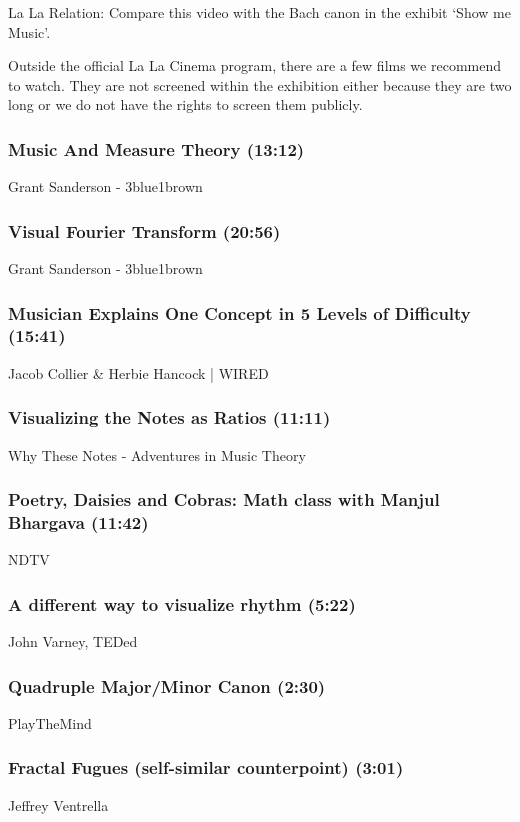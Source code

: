La La Relation: Compare this video with the Bach canon in the exhibit `Show me Music'.


Outside the official La La Cinema program, there are a few films we recommend to watch. They are not screened within the exhibition either because they are two long or we do not have the rights to screen them publicly.

\subsubsection*{Music And Measure Theory (13:12)}
Grant Sanderson - 3blue1brown

\subsubsection*{Visual Fourier Transform (20:56)}
Grant Sanderson - 3blue1brown

\subsubsection*{Musician Explains One Concept in 5 Levels of Difficulty (15:41)}
Jacob Collier \& Herbie Hancock | WIRED

\subsubsection*{Visualizing the Notes as Ratios (11:11)}
Why These Notes - Adventures in Music Theory

\subsubsection*{Poetry, Daisies and Cobras: Math class with Manjul Bhargava (11:42)}
NDTV

\subsubsection*{A different way to visualize rhythm (5:22)}
John Varney, TEDed

\subsubsection*{Quadruple Major/Minor Canon (2:30)}
PlayTheMind

\subsubsection*{Fractal Fugues (self-similar counterpoint) (3:01)}
Jeffrey Ventrella

